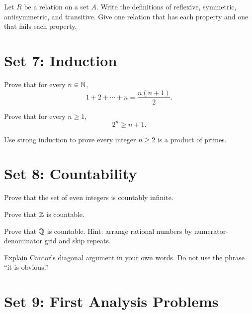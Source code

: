 \documentclass[11pt]{article}
\begin{document}
\begin{exercise}
Let $R$ be a relation on a set $A$. Write the definitions of reflexive, symmetric, antisymmetric, and transitive. Give one relation that has each property and one that fails each property.
\end{exercise}

\section{Set 7: Induction}

\begin{exercise}
Prove that for every $n\in\mathbb{N}$,
\[
1+2+\cdots+n=\frac{n(n+1)}{2}.
\]
\end{exercise}

\begin{exercise}
Prove that for every $n\geq 1$,
\[
2^n\geq n+1.
\]
\end{exercise}

\begin{exercise}
Use strong induction to prove every integer $n\geq 2$ is a product of primes.
\end{exercise}

\section{Set 8: Countability}

\begin{exercise}
Prove that the set of even integers is countably infinite.
\end{exercise}

\begin{exercise}
Prove that $\mathbb{Z}$ is countable.
\end{exercise}

\begin{exercise}
Prove that $\mathbb{Q}$ is countable. Hint: arrange rational numbers by numerator-denominator grid and skip repeats.
\end{exercise}

\begin{exercise}
Explain Cantor's diagonal argument in your own words. Do not use the phrase ``it is obvious.''
\end{exercise}

\section{Set 9: First Analysis Problems}
\end{document}
